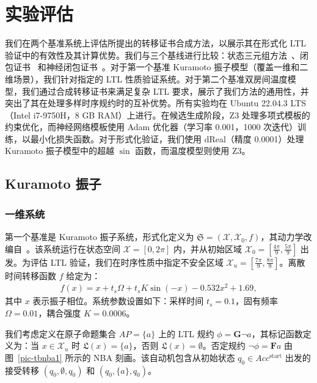 ﻿\section{实验评估}
\label{sec:experiments}

我们在两个基准系统上评估所提出的转移证书合成方法，以展示其在形式化 LTL 验证中的有效性及其计算优势。我们与三个基线进行比较：状态三元组方法~\cite{wongpiromsarn2015automata}、闭包证书~\cite{murali2024closure} 和神经闭包证书~\cite{nadali2024neural}。对于第一个基准 Kuramoto 振子模型（覆盖一维和二维场景），我们针对指定的 LTL 性质验证系统。对于第二个基准双房间温度模型，我们通过合成转移证书来满足复杂 LTL 要求，展示了我们方法的通用性，并突出了其在处理多样时序规约时的互补优势。所有实验均在 Ubuntu 22.04.3 LTS（Intel i7-9750H，8 GB RAM）上进行。在候选生成阶段，Z3 处理多项式模板的约束优化，而神经网络模板使用 Adam 优化器（学习率 0.001，1000 次迭代）训练，以最小化损失函数。对于形式化验证，我们使用 dReal（精度 0.0001）处理 Kuramoto 振子模型中的超越 $\sin$ 函数，而温度模型则使用 Z3。

\subsection{Kuramoto 振子}
\subsubsection{一维系统}
第一个基准是 Kuramoto 振子系统，形式化定义为 $\mathfrak{S} = (\mathcal{X}, \mathcal{X}_0, f)$，其动力学改编自~\cite{anand2022small}。该系统运行在状态空间 $\mathcal{X} = [0, 2\pi]$ 内，并从初始区域 $\mathcal{X}_0 = [\frac{4\pi}{9}, \frac{5\pi}{9}]$ 出发。为评估 LTL 验证，我们在时序性质中指定不安全区域 $\mathcal{X}_u = [\frac{7\pi}{9}, \frac{8\pi}{9}]$。离散时间转移函数 $f$ 给定为：
\begin{align}
f(x) = x + t_s\Omega + t_s K \sin(-x) - 0.532 x^2 + 1.69,
\end{align}
其中 $x$ 表示振子相位。系统参数设置如下：采样时间 $t_s = 0.1$，固有频率 $\Omega = 0.01$，耦合强度 $K = 0.0006$。



我们考虑定义在原子命题集合 $AP = \{a\}$ 上的 LTL 规约 $\phi = \mathbf{G}\neg a$，其标记函数定义为：当 $x \in \mathcal{X}_u$ 时 $\mathfrak{L}(x) = \{a\}$，否则 $\mathfrak{L}(x) = \emptyset$。否定规约 $\neg \phi = \mathbf{F} a$ 由图~\ref{pic-tbnba1} 所示的 NBA 刻画。该自动机包含从初始状态 $q_0 \in Acc^{\text{start}}$ 出发的接受转移 $(q_0, \emptyset, q_0)$ 和 $(q_0, \{a\}, q_0)$。

